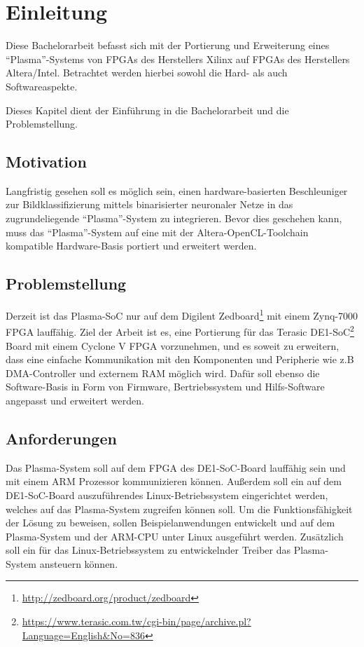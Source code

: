 \chapter{Einleitung}
\label{cha:introduction}

Diese Bachelorarbeit befasst sich mit der Portierung und Erweiterung eines \enquote{Plasma}-Systems \cite{website:plasma_cpu} von \glspl{FPGA} des Herstellers Xilinx auf \glspl{FPGA} des Herstellers Altera/Intel. Betrachtet werden hierbei sowohl die Hard- als auch Softwareaspekte. 

Dieses Kapitel dient der Einführung in die Bachelorarbeit und die Problemstellung.

\section{Motivation}

Langfristig gesehen soll es möglich sein, einen hardware-basierten Beschleuniger zur Bildklassifizierung mittels binarisierter neuronaler Netze\cite{thesis:soc_bnn} in das zugrundeliegende \enquote{Plasma}-System zu integrieren. Bevor dies geschehen kann, muss das \enquote{Plasma}-System auf eine mit der Altera-OpenCL-Toolchain kompatible Hardware-Basis portiert und erweitert werden. 

\section{Problemstellung}

Derzeit ist das Plasma-\gls{SoC} nur auf dem Digilent Zedboard\footnote{\url{http://zedboard.org/product/zedboard}} mit einem Zynq-7000 \gls{FPGA} lauffähig. Ziel der Arbeit ist es, eine Portierung für das Terasic DE1-SoC\footnote{\url{https://www.terasic.com.tw/cgi-bin/page/archive.pl?Language=English&No=836}} Board mit einem Cyclone V \gls{FPGA} vorzunehmen, und es soweit zu erweitern, dass eine einfache Kommunikation mit den Komponenten und Peripherie wie z.B \gls{DMA}-Controller und externem \gls{RAM} möglich wird. Dafür soll ebenso die Software-Basis in Form von Firmware, Bertriebssystem und  Hilfs-Software angepasst und erweitert werden. 

\section{Anforderungen}

Das Plasma-System soll auf dem \gls{FPGA} des DE1-SoC-Board lauffähig sein und mit einem \gls{ARM} Prozessor kommunizieren können. Außerdem soll ein auf dem DE1-SoC-Board auszuführendes Linux-Betriebssystem eingerichtet werden, welches auf das Plasma-System zugreifen können soll. Um die Funktionsfähigkeit der Lösung zu beweisen, sollen Beispielanwendungen entwickelt und auf dem Plasma-System und der \gls{ARM}-CPU unter Linux ausgeführt werden. Zusätzlich soll ein für das Linux-Betriebssystem zu entwickelnder Treiber das Plasma-System ansteuern können.

